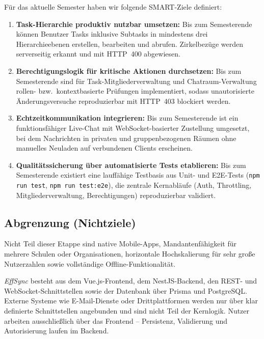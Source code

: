 Für das aktuelle Semester haben wir folgende SMART-Ziele definiert:

\begin{enumerate}
    \item \textbf{Task-Hierarchie produktiv nutzbar umsetzen:}
          Bis zum Semesterende können Benutzer Tasks inklusive Subtasks in
          mindestens drei Hierarchieebenen erstellen, bearbeiten und abrufen.
          Zirkelbezüge werden serverseitig erkannt und mit HTTP~400 abgewiesen.

    \item \textbf{Berechtigungslogik für kritische Aktionen durchsetzen:}
          Bis zum Semesterende sind für Task-Mitgliederverwaltung und
          Chatraum-Verwaltung rollen- bzw.\ kontextbasierte Prüfungen
          implementiert, sodass unautorisierte Änderungsversuche reproduzierbar
          mit HTTP~403 blockiert werden.

    \item \textbf{Echtzeitkommunikation integrieren:}
          Bis zum Semesterende ist ein funktionsfähiger Live-Chat mit
          WebSocket-basierter Zustellung umgesetzt, bei dem Nachrichten in
          privaten und gruppenbezogenen Räumen ohne manuelles Neuladen auf
          verbundenen Clients erscheinen.

    \item \textbf{Qualitätssicherung über automatisierte Tests etablieren:}
          Bis zum Semesterende existiert eine lauffähige Testbasis aus Unit- und
          E2E-Tests (\texttt{npm run test}, \texttt{npm run test:e2e}), die
          zentrale Kernabläufe (Auth, Throttling, Mitgliederverwaltung,
          Berechtigungen) reproduzierbar validiert.
\end{enumerate}

\subsection*{Abgrenzung (Nichtziele)}

Nicht Teil dieser Etappe sind native Mobile-Apps, Mandantenfähigkeit für mehrere
Schulen oder Organisationen, horizontale Hochskalierung für sehr große Nutzerzahlen
sowie vollständige Offline-Funktionalität.



\textit{EffSync} besteht aus dem Vue.js-Frontend, dem NestJS-Backend, den REST-
und WebSocket-Schnittstellen sowie der Datenbank über Prisma und PostgreSQL.
Externe Systeme wie E-Mail-Dienste oder Drittplattformen werden nur über klar
definierte Schnittstellen angebunden und sind nicht Teil der Kernlogik.
Nutzer arbeiten ausschließlich über das Frontend -- Persistenz, Validierung und
Autorisierung laufen im Backend.


